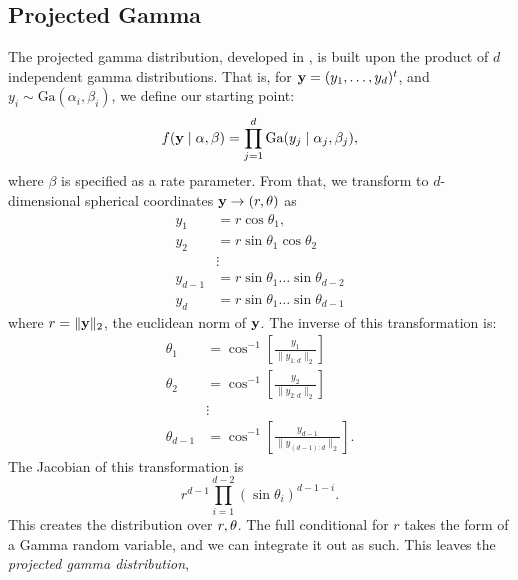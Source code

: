 \subsection{Projected Gamma}
\label{method:pg}
The projected gamma distribution, developed in \cite{nunez2019}, is built upon
  the product of $d$ independent gamma distributions.  That is, for
  ${\bf y} = (y_1,\ldots,y_d)^t$, and $y_i\sim\text{Ga}(\alpha_i,\beta_i)$, we
  define our starting point:
\begin{equation}
    f({\bf y}\mid{\bf \alpha},{\bf \beta}) = \prod_{j = 1}^d\text{Ga}(y_j\mid\alpha_j,\beta_j),
\end{equation}
where $\beta$ is specified as a rate parameter.  From that, we transform to
  $d$-dimensional spherical coordinates ${\bf y} \rightarrow (r,{\bf \theta})$
  as
\begin{equation}
  \label{eqn:transform}
  \begin{aligned}
    y_1     &= r\cos\theta_1,\\
    y_2     &= r\sin\theta_1\cos\theta_2\\
            &\vdots\\
    y_{d-1} &= r\sin\theta_1\ldots\sin\theta_{d-2}\\
    y_{d}   &= r\sin\theta_1\ldots\sin\theta_{d-1}
  \end{aligned}
\end{equation}
where $r = \lVert {\bf y}\rVert_{2}$, the euclidean norm of ${\bf y}$.  The
  inverse of this transformation is:
\begin{equation}
  \label{eqn:invtransform}
  \begin{aligned}
    \theta_1     &= \cos^{-1}\left[\frac{y_1}{\lVert y_{1:d}\rVert_2}\right]\\
    \theta_2     &= \cos^{-1}\left[\frac{y_2}{\lVert y_{2:d}\rVert_2}\right]\\
                 &\vdots\\
    \theta_{d-1} &= \cos^{-1}\left[\frac{y_{d-1}}{\lVert y_{(d-1):d}\rVert_2}\right].
  \end{aligned}
\end{equation}
The Jacobian of this transformation is
\begin{equation*}
r^{d-1}\prod_{i = 1}^{d-2}(\sin\theta_i)^{d-1-i}.
\end{equation*}
This creates the distribution over $r,{\bf \theta}$.  The full conditional for
  $r$ takes the form of a Gamma random variable, and we can integrate it out as
  such.  This leaves the \emph{projected gamma distribution},
